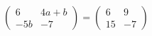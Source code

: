 $\begin{pmatrix} 6 & 4a+b \\ -5b & -7 \end{pmatrix}=\begin{pmatrix} 6 & 9 \\ 15 & -7 \end{pmatrix}$
